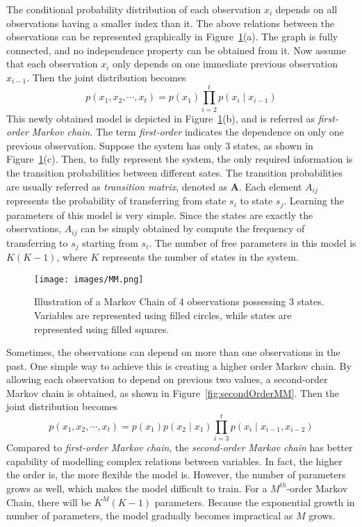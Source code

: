 The conditional probability distribution of each observation \(x_i\) depends on all observations having a smaller index than it. The above relations between the observations can be represented graphically in Figure~\ref{fig:MM}(a). The graph is fully connected, and no independence property can be obtained from it. Now assume that each observation \(x_i\) only depends on one immediate previous observation \(x_{i-1}\). Then the joint distribution becomes 
\begin{equation}
	p(x_1, x_2, \cdots, x_t) = p(x_1)\prod_{i = 2}^{t} p(x_i \mid x_{i-1})
\end{equation}
This newly obtained model is depicted in Figure~\ref{fig:MM}(b), and is referred as \textit{first-order Markov chain}. The term \textit{first-order} indicates the dependence on only one previous observation. Suppose the system has only 3 states, as shown in Figure~\ref{fig:MM}(c). Then, to fully represent the system, the only required information is the transition probabilities between different sates. The transition probabilities are usually referred as \textit{transition matrix}, denoted as \(\mathbf{A}\). Each element \(A_{ij}\) represents the probability of transferring from state \(s_i\) to state \(s_j\). Learning the parameters of this model is very simple. Since the states are exactly the observations, \(A_{ij}\) can be simply obtained by compute the frequency of transferring to \(s_j\) starting from \(s_i\). The number of free parameters in this model is \(K(K-1)\), where \(K\) represents the number of states in the system.

\begin{figure}[!ht]
	\begin{center}
		\texttt{[image: images/MM.png]}
		\caption{Illustration of a Markov Chain of 4 observations possessing 3 states. Variables are represented using filled circles, while states are represented using filled squares.}
		\label{fig:MM}
	\end{center}
\end{figure}

Sometimes, the observations can depend on more than one observations in the past. One simple way to achieve this is creating a higher order Markov chain. By allowing each observation to depend on previous two values, a second-order Markov chain is obtained, as shown in Figure~\ref{fig:secondOrderMM}. Then the joint distribution becomes
\begin{equation}
	p(x_1, x_2, \cdots, x_t) = p(x_1)p(x_2 \mid x_1)\prod_{i = 3}^{t} p(x_i \mid x_{i-1}, x_{i-2})
\end{equation}
Compared to \textit{first-order Markov chain}, the \textit{second-order Markov chain} has better capability of modelling complex relations between variables. In fact, the higher the order is, the more flexible the model is. However, the number of parameters grows as well, which makes the model difficult to train. For a \(M^{th}\)-order Markov Chain, there will be \(K^{M}(K-1)\) parameters. Because the exponential growth in number of parameters, the model gradually becomes impractical as \(M\) grows. 

